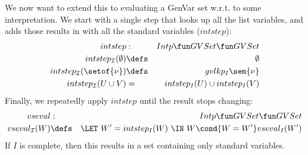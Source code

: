 We now want to extend this to 
evaluating a GenVar set w.r.t. to some interpretation.
We start with a single step that looks up all the list variables,
and adds those results in with all the standard variables ($intstep$):
\begin{eqnarray}
   intstep                  &  :  & Intp \fun GVSet \fun GVSet
\\ intstep_\intp(\emptyset) &\defs& \emptyset
\\ intstep_\intp(\setof{\nu}) &\defs& gvlkp_I\sem{\nu}
\\ intstep_\intp(U \cup V)    &  =  & intstep_I(U) \cup intstep_I(V)
\end{eqnarray}
Finally, we repeatedly apply $intstep$ 
until the result stops changing:
\begin{eqnarray}
   vseval          &  :  & Intp \fun GVSet \fun GVSet
\\ vseval_\intp(W) 
   &\defs& 
   \LET~W' = intstep_I(W)
   ~\IN~ W \cond{ W=W' } vseval_I(W')
\end{eqnarray}
If $I$ is complete, then this results in a set containing only standard variables.

